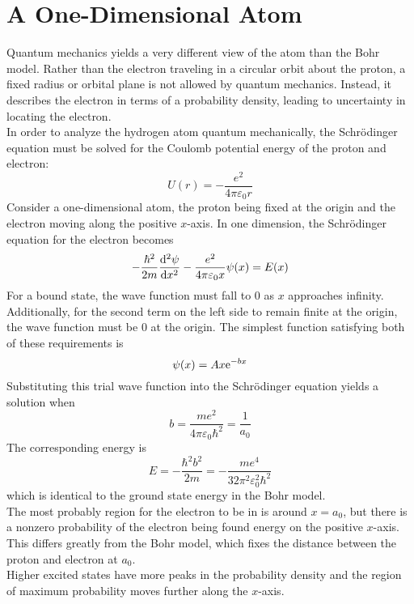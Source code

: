 \documentclass{subfiles}
\begin{document}
	\section{A One-Dimensional Atom}
		Quantum mechanics yields a very different view of the atom than the Bohr model. Rather than the electron traveling in a circular orbit about the proton, a fixed radius or orbital plane is not allowed by quantum mechanics. Instead, it describes the electron in terms of a probability density, leading to uncertainty in locating the electron. \\
		In order to analyze the hydrogen atom quantum mechanically, the Schr\"odinger equation must be solved for the Coulomb potential energy of the proton and electron:
			\[U(r) = -\frac{e^2}{4\pi\varepsilon_0r}\]
			Consider a one-dimensional atom, the proton being fixed at the origin and the electron moving along the positive \(x\)-axis. In one dimension, the Schr\"odinger equation for the electron becomes
			\[-\frac{\hbar^2}{2m}\dv[2]{\psi}{x} - \frac{e^2}{4\pi\varepsilon_0x}\psi(x) = E(x)\]
			For a bound state, the wave function must fall to 0 as \(x\) approaches infinity. Additionally, for the second term on the left side to remain finite at the origin, the wave function must be 0 at the origin. The simplest function satisfying both of these requirements is
			\[\psi(x) = Ax\text{e}^{-bx}\]
			Substituting this trial wave function into the Schr\"odinger equation yields a solution when
			\[
				b = \frac{me^2}{4\pi\varepsilon_0\hbar^2}
					= \frac{1}{a_0}
			\]
			The corresponding energy is
			\[
				E = -\frac{\hbar^2b^2}{2m}
					= -\frac{me^4}{32\pi^2\varepsilon_0^2\hbar^2}
			\]
			which is identical to the ground state energy in the Bohr model. \\
			The most probably region for the electron to be in is around \(x = a_0\), but there is a nonzero probability of the electron being found energy on the positive \(x\)-axis. This differs greatly from the Bohr model, which fixes the distance between the proton and electron at \(a_0\). \\
			Higher excited states have more peaks in the probability density and the region of maximum probability moves further along the \(x\)-axis.
\end{document}
